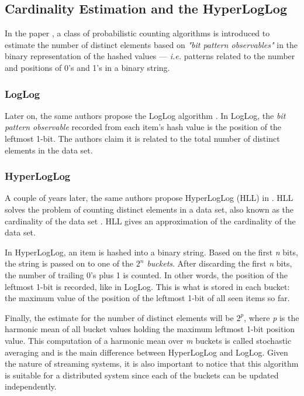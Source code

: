 \subsection{Cardinality Estimation and the HyperLogLog}
In the paper \cite{Flajolet-PCA}, a class of probabilistic counting algorithms is introduced to estimate the number of distinct elements based on \textit{"bit pattern observables"} in the binary representation of the hashed values --- \textit{i.e.} patterns related to the number and positions of 0's and 1's in a binary string.

\subsubsection{LogLog}
Later on, the same authors propose the LogLog algorithm \cite{Flajolet-LogLog}. In LogLog, the \textit{bit pattern observable} recorded from each item's hash value is the position of the leftmost 1-bit. The authors claim it is related to the total number of distinct elements in the data set.

\subsubsection{HyperLogLog}
A couple of years later, the same authors propose HyperLogLog (HLL) in \cite{Flajolet-HLL}. HLL solves the problem of counting distinct elements in a data set, also known as the cardinality of the data set \cite{Flajolet-HLL}. HLL gives an approximation of the cardinality of the data set. 

In HyperLogLog, an item is hashed into a binary string. Based on the first \textit{n} bits, the string is passed on to one of the \textit{$2^n$ buckets}. After discarding the first \textit{n} bits, the number of trailing 0's plus 1 is counted. In other words, the position of the leftmost 1-bit is recorded, like in LogLog. This is what is stored in each bucket: the maximum value of the position of the leftmost 1-bit of all seen items so far. 


Finally, the estimate for the number of distinct elements will be $2^p$, where \textit{p} is the harmonic mean of all bucket values holding the maximum leftmost 1-bit position value. This computation of a harmonic mean over \textit{m} buckets is called stochastic averaging and is the main difference between HyperLogLog and LogLog. Given the nature of streaming systems, it is also important to notice that this algorithm is suitable for a distributed system since each of the buckets can be updated independently.

